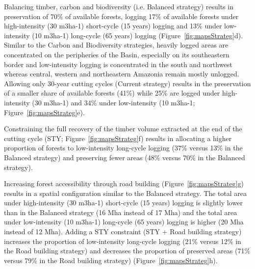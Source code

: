 \documentclass{article}
\begin{document}
Balancing timber, carbon and biodiversity (i.e. Balanced strategy) results in preservation of 70\% of available forests, logging 17\% of available forests under high-intensity (30 m3ha-1) short-cycle (15 years) logging and 13\% under low-intensity (10 m3ha-1) long-cycle (65 years) logging (Figure~\ref{fig:mapsStrateg}d). Similar to the Carbon and Biodiversity strategies, heavily logged areas are concentrated on the peripheries of the Basin, especially on its southeastern border and  low-intensity logging is concentrated in the south and northwest whereas central, western and northeastern Amazonia remain mostly unlogged. Allowing only 30-year cutting cycles (Current strategy) results in the preservation of a smaller share of available forests (41\%) while 25\% are logged under high-intensity (30 m3ha-1) and 34\% under low-intensity (10 m3ha-1;  Figure~\ref{fig:mapsStrateg}e). 

Constraining the full recovery of the timber volume extracted at the end of the cutting cycle (STY; Figure~\ref{fig:mapsStrateg}f) results in allocating a higher proportion of forests to low-intensity long-cycle logging (37\% versus 13\% in the Balanced strategy)  and preserving fewer areas (48\% versus 70\% in the Balanced strategy).

Increasing forest accessibility through road building (Figure~\ref{fig:mapsStrateg}g) results in a spatial configuration similar to the Balanced strategy. The total area under high-intensity (30 m3ha-1) short-cycle (15 years) logging is slightly lower than in the Balanced strategy (16 Mha instead of 17 Mha) and the total area under low-intensity (10 m3ha-1) long-cycle (65 years) logging is higher (20 Mha instead of 12 Mha). Adding a STY constraint (STY + Road building strategy) increases the proportion of low-intensity long-cycle logging (21\% versus 12\% in the Road building strategy) and decreases the proportion of preserved areas (71\% versus 79\% in the Road building strategy)  (Figure~\ref{fig:mapsStrateg}h). 
\end{document}
